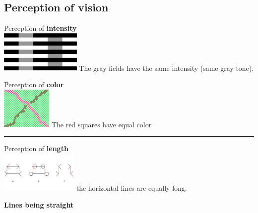 \documentclass[a4paper, fontsize=8pt, landscape, DIV=1]{scrartcl}
\begin{document}
\begin{multicols*}{4}
		\subsection{Perception of vision}
		\begin{minipage}[t]{0.49\columnwidth}
			\begin{flushleft}
				{\centering Perception of \textbf{intensity}\\}
				\includegraphics[width=\columnwidth, height=2cm]{images/Introduction/perc_intensity.png} 
				The gray fields have the same intensity (same gray tone).
			\end{flushleft}
		\end{minipage}
		\begin{minipage}[t]{0.49\columnwidth}
			\begin{flushright}
				{\centering Perception of \textbf{color}\\}
				\includegraphics[width=\columnwidth, height=2cm]{images/Introduction/perc_color.png}
				The red squares have equal color
			\end{flushright}
		\end{minipage}
		\hrule
		\begin{minipage}[t]{0.49\columnwidth}
			\begin{flushleft}
				{\centering Perception of \textbf{length}\\}
				\includegraphics[width=\columnwidth, height=2cm]{images/Introduction/perc_length.png} 
				the horizontal lines are equally long.
			\end{flushleft}
		\end{minipage}
		\begin{minipage}[t]{0.49\columnwidth}
			\begin{flushright}
				{\centering \textbf{Lines being straight}
}
\end{flushright}
\end{minipage}
\end{multicols*}
\end{document}
